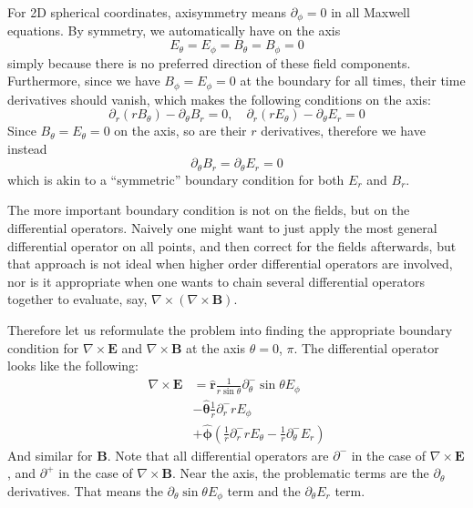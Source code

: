 For 2D spherical coordinates, axisymmetry means $\partial_{\phi} = 0$ in all
Maxwell equations. By symmetry, we automatically have on the axis
\begin{equation}
  E_{\theta} = E_{\phi} = B_{\theta} = B_{\phi} = 0
\end{equation}
simply because there is no preferred direction of these field components.
Furthermore, since we have $B_{\phi} = E_{\phi} = 0$ at the boundary for all
times, their time derivatives should vanish, which makes the following
conditions on the axis:
\begin{equation}
  \partial_r(rB_{\theta}) - \partial_{\theta}B_r = 0,\quad \partial_r(rE_{\theta}) - \partial_{\theta}E_{r} = 0
\end{equation}
Since $B_{\theta} = E_{\theta} = 0$ on the axis, so are their $r$
derivatives, therefore we have instead
\begin{equation}
  \partial_{\theta}B_r = \partial_{\theta}E_r = 0
\end{equation}
which is akin to a ``symmetric'' boundary condition for both $E_r$ and $B_r$.

The more important boundary condition is not on the fields, but on the
differential operators. Naively one might want to just apply the most
general differential operator on all points, and then correct for the
fields afterwards, but that approach is not ideal when higher order
differential operators are involved, nor is it appropriate when one
wants to chain several differential operators together to evaluate,
say, $\nabla\times(\nabla\times \mathbf{B})$.

Therefore let us reformulate the problem into finding the appropriate
boundary condition for $\nabla\times \mathbf{E}$ and $\nabla\times
\mathbf{B}$ at the axis $\theta = 0$, $\pi$. The differential operator
looks like the following:
\begin{equation}
  \begin{split}
    \nabla\times \mathbf{E} &= \hat{\mathbf{r}}\frac{1}{r\sin\theta}\partial_{\theta}^-\sin\theta E_{\phi} \\
    &- \hat{\bm{\theta}}\frac{1}{r}\partial_r^-rE_{\phi} \\
    &+ \hat{\bm{\phi}}\left( \frac{1}{r}\partial_r^-rE_\theta - \frac{1}{r}\partial_{\theta}^-E_r \right)
  \end{split}
\end{equation}
And similar for $\mathbf{B}$. Note that all differential operators are
$\partial^-$ in the case of $\nabla\times \mathbf{E}$, and
$\partial^+$ in the case of $\nabla\times \mathbf{B}$. Near the axis,
the problematic terms are the $\partial_{\theta}$ derivatives. That
means the $\partial_{\theta}\sin\theta E_{\phi}$ term and the
$\partial_{\theta}E_r$ term.

